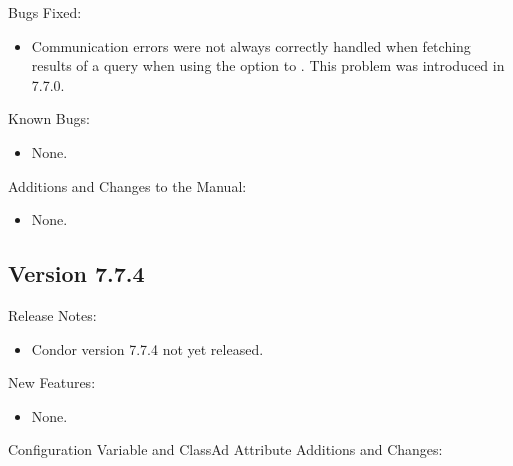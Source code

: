 \noindent Bugs Fixed:

\begin{itemize}

\item Communication errors were not always correctly handled when
fetching results of a query when using the  option to
.  This problem was introduced in 7.7.0.

\end{itemize}

\noindent Known Bugs:

\begin{itemize}

\item None.

\end{itemize}

\noindent Additions and Changes to the Manual:

\begin{itemize}

\item None.

\end{itemize}


\subsection*{\label{sec:New-7-7-4}Version 7.7.4}

\noindent Release Notes:

\begin{itemize}

\item Condor version 7.7.4 not yet released.

\end{itemize}


\noindent New Features:

\begin{itemize}

\item None.

\end{itemize}

\noindent Configuration Variable and ClassAd Attribute Additions and Changes:

